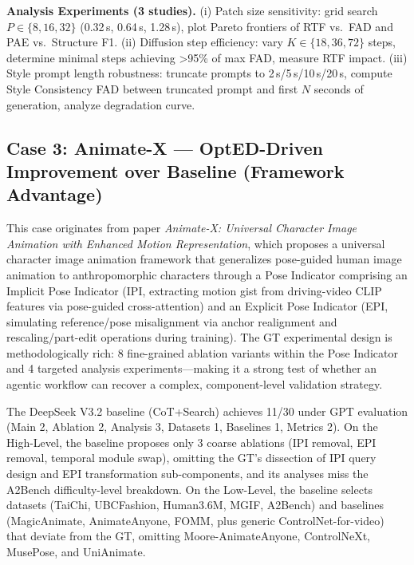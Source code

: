 \begin{tcolorbox}
\smallskip
\textbf{Analysis Experiments (3 studies).} (i) Patch size sensitivity: grid search $P\in\{8,16,32\}$ (0.32\,s, 0.64\,s, 1.28\,s), plot Pareto frontiers of RTF vs.\ FAD and PAE vs.\ Structure F1. (ii) Diffusion step efficiency: vary $K\in\{18,36,72\}$ steps, determine minimal steps achieving >95\% of max FAD, measure RTF impact. (iii) Style prompt length robustness: truncate prompts to 2\,s/5\,s/10\,s/20\,s, compute Style Consistency FAD between truncated prompt and first $N$ seconds of generation, analyze degradation curve.
\end{tcolorbox}

\subsection{Case 3: Animate-X --- OptED-Driven Improvement over Baseline (Framework Advantage)}

This case originates from paper \textit{Animate-X: Universal Character Image Animation with Enhanced Motion Representation}\cite{tan2024animate}, which proposes a universal character image animation framework that generalizes pose-guided human image animation to anthropomorphic characters through a Pose Indicator comprising an Implicit Pose Indicator (IPI, extracting motion gist from driving-video CLIP features via pose-guided cross-attention) and an Explicit Pose Indicator (EPI, simulating reference/pose misalignment via anchor realignment and rescaling/part-edit operations during training). The GT experimental design is methodologically rich: 8 fine-grained ablation variants within the Pose Indicator and 4 targeted analysis experiments---making it a strong test of whether an agentic workflow can recover a complex, component-level validation strategy.

The DeepSeek V3.2 baseline (CoT+Search) achieves 11/30 under GPT evaluation (Main 2, Ablation 2, Analysis 3, Datasets 1, Baselines 1, Metrics 2). On the High-Level, the baseline proposes only 3 coarse ablations (IPI removal, EPI removal, temporal module swap), omitting the GT's dissection of IPI query design and EPI transformation sub-components, and its analyses miss the A2Bench difficulty-level breakdown. On the Low-Level, the baseline selects datasets (TaiChi, UBCFashion, Human3.6M, MGIF, A2Bench) and baselines (MagicAnimate, AnimateAnyone, FOMM, plus generic ControlNet-for-video) that deviate from the GT, omitting Moore-AnimateAnyone, ControlNeXt, MusePose, and UniAnimate.

